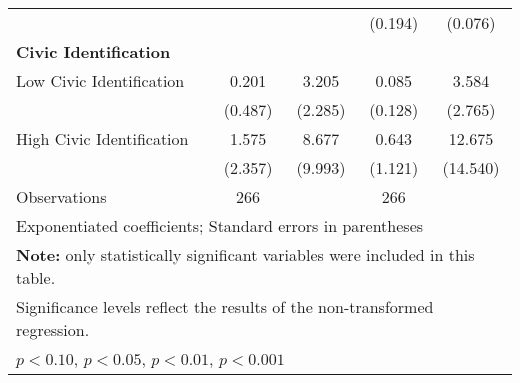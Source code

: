\begin{table}[htbp]
\begin{tabular}{l*{4}{c}}
                              &                   &                   &   (0.194)         &   (0.076)         \\
\textbf{Civic Identification} &                   &                   &                   &                   \\
\hspace{0.25cm} Low Civic Identification&     0.201         &     3.205         &     0.085         &     3.584         \\
                              &   (0.487)         &   (2.285)         &   (0.128)         &   (2.765)         \\
\hspace{0.25cm} High Civic Identification&     1.575         &     8.677\sym{^+} &     0.643         &    12.675\sym{*}  \\
                              &   (2.357)         &   (9.993)         &   (1.121)         &  (14.540)         \\
\midrule
Observations                  &       266         &                   &       266         &                   \\
\bottomrule
\multicolumn{5}{l}{\footnotesize Exponentiated coefficients; Standard errors in parentheses}\\
\multicolumn{5}{l}{\footnotesize \textbf{Note:} only statistically significant variables were included in this table.}\\
\multicolumn{5}{l}{\footnotesize Significance levels reflect the results of the non-transformed regression.}\\
\multicolumn{5}{l}{\footnotesize \sym{^+} \(p<0.10\), \sym{*} \(p<0.05\), \sym{**} \(p<0.01\), \sym{***} \(p<0.001\)}\\
\end{tabular}
\end{table}
